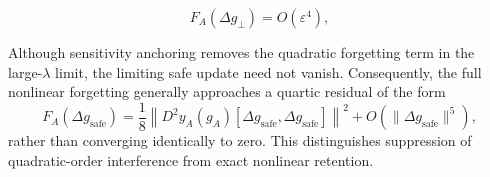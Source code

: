 \[
    F_A(\Delta g_\perp)=O(\varepsilon^4),
\]


Although sensitivity anchoring removes the quadratic forgetting term in the
large-\(\lambda\) limit, the limiting safe update need not vanish. Consequently,
the full nonlinear forgetting generally approaches a quartic residual of the
form
\[
    F_A(\Delta g_{\mathrm{safe}})
    =
    \frac{1}{8}
    \left\|
    D^2y_A(g_A)
    [\Delta g_{\mathrm{safe}},\Delta g_{\mathrm{safe}}]
    \right\|^2
    +
    O(\|\Delta g_{\mathrm{safe}}\|^5),
\]
rather than converging identically to zero. This distinguishes suppression of
quadratic-order interference from exact nonlinear retention.
